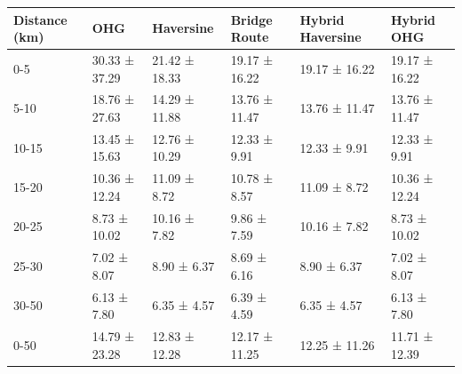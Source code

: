 \begin{tabular}{llllll}
\toprule
Distance (km) & OHG & Haversine & Bridge Route & Hybrid Haversine & Hybrid OHG \\
\midrule
0-5 & 30.33 ± 37.29 & 21.42 ± 18.33 & 19.17 ± 16.22 & 19.17 ± 16.22 & 19.17 ± 16.22 \\
5-10 & 18.76 ± 27.63 & 14.29 ± 11.88 & 13.76 ± 11.47 & 13.76 ± 11.47 & 13.76 ± 11.47 \\
10-15 & 13.45 ± 15.63 & 12.76 ± 10.29 & 12.33 ± 9.91 & 12.33 ± 9.91 & 12.33 ± 9.91 \\
15-20 & 10.36 ± 12.24 & 11.09 ± 8.72 & 10.78 ± 8.57 & 11.09 ± 8.72 & 10.36 ± 12.24 \\
20-25 & 8.73 ± 10.02 & 10.16 ± 7.82 & 9.86 ± 7.59 & 10.16 ± 7.82 & 8.73 ± 10.02 \\
25-30 & 7.02 ± 8.07 & 8.90 ± 6.37 & 8.69 ± 6.16 & 8.90 ± 6.37 & 7.02 ± 8.07 \\
30-50 & 6.13 ± 7.80 & 6.35 ± 4.57 & 6.39 ± 4.59 & 6.35 ± 4.57 & 6.13 ± 7.80 \\
0-50 & 14.79 ± 23.28 & 12.83 ± 12.28 & 12.17 ± 11.25 & 12.25 ± 11.26 & 11.71 ± 12.39 \\
\bottomrule
\end{tabular}
